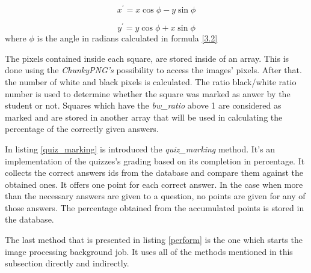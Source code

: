 \begin{equation}
x^{\prime} = x \cos \phi - y \sin \phi \label{3.4}
\end{equation}

\begin{equation}
y^{\prime} = y \cos \phi + x \sin \phi \label{3.5}
\end{equation}
where $\phi$ is the angle in radians calculated in formula \ref{3.2}

The pixels contained inside each square, are stored inside of an array. This is done using the \textit{ChunkyPNG's} possibility to access the images' pixels. After that. the number of white and black pixels is calculated. The ratio black/white ratio number is used to determine whether the square was marked as anwer by the student or not. Squares which have the \textit{bw\_ratio} above 1 are considered as marked and are stored in another array that will be used in calculating the percentage of the correctly given answers.



In listing \ref{quiz_marking} is introduced the \textit{quiz\_marking} method. It's an implementation of the quizzes's grading based on its completion in percentage. It collects the correct answers ids from the database and compare them against the obtained ones. It offers one point for each correct answer. In the case when more than the necessary answers are given to a question, no points are given for any of those answers. The percentage obtained from the accumulated points is stored in the database.





The last method that is presented in listing \ref{perform} is the one which starts the image processing background job. It uses all of the methods mentioned in this subsection directly and indirectly.




\clearpage